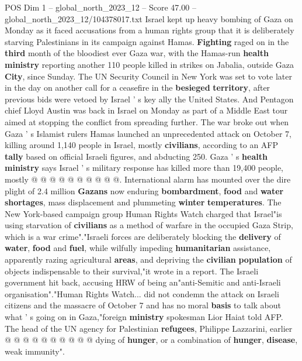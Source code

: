 \begin{textsample}{POS Dim 1 – global\_north\_2023\_12 – Score 47.00 – global\_north\_2023\_12/104378017.txt}  \label{ex:f1_pos_083}
Israel kept up heavy bombing of Gaza on Monday as it faced accusations from a human rights group that it is deliberately starving Palestinians in its campaign against Hamas. \textbf{Fighting} raged on in the \textbf{third} month of the bloodiest ever Gaza war, with the Hamas-run \textbf{health} \textbf{ministry} reporting another 110 people killed in strikes on Jabalia, outside Gaza \textbf{City}, since Sunday.
The UN Security Council in New York was set to vote later in the day on another call for a ceasefire in the \textbf{besieged} \textbf{territory}, after previous bids were vetoed by Israel ' s key ally the United States.
And Pentagon chief Lloyd Austin was back in Israel on Monday as part of a Middle East tour aimed at stopping the conflict from spreading further.
The war broke out when Gaza ' s Islamist rulers Hamas launched an unprecedented attack on October 7, killing around 1,140 people in Israel, mostly \textbf{civilians}, according to an AFP \textbf{tally} based on official Israeli figures, and abducting 250.
Gaza ' s \textbf{health} \textbf{ministry} says Israel ' s military response has killed more than 19,400 people, mostly @ @ @ @ @ @ @ @ @ @.
International alarm has mounted over the dire plight of 2.4 million \textbf{Gazans} now enduring \textbf{bombardment}, \textbf{food} and \textbf{water} \textbf{shortages}, mass displacement and plummeting \textbf{winter} \textbf{temperatures}.
The New York-based campaign group Human Rights Watch charged that Israel"is using starvation of \textbf{civilians} as a method of warfare in the occupied Gaza Strip, which is a war crime"."Israeli forces are deliberately blocking the \textbf{delivery} of \textbf{water}, \textbf{food} and \textbf{fuel}, while wilfully impeding \textbf{humanitarian} assistance, apparently razing agricultural \textbf{areas}, and depriving the \textbf{civilian} \textbf{population} of objects indispensable to their survival,"it wrote in a report.
The Israeli government hit back, accusing HRW of being an"anti-Semitic and anti-Israeli organisation"."Human Rights Watch... did not condemn the attack on Israeli citizens and the massacre of October 7 and has no moral \textbf{basis} to talk about what ' s going on in Gaza,"foreign \textbf{ministry} spokesman Lior Haiat told AFP.
The head of the UN agency for Palestinian \textbf{refugees}, Philippe Lazzarini, earlier @ @ @ @ @ @ @ @ @ @ dying of \textbf{hunger}, or a combination of \textbf{hunger}, \textbf{disease}, weak immunity".

\end{textsample}

